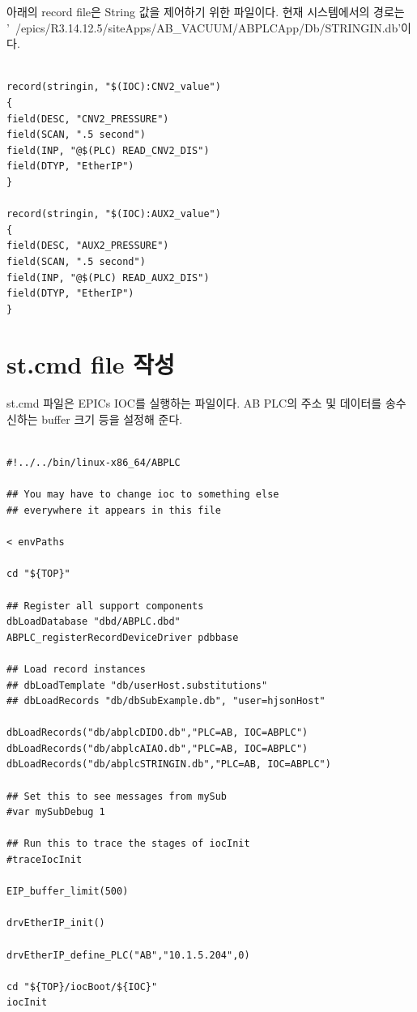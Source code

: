\documentclass[11pt
  , a4paper
  , article
  , oneside
]{memoir}
\begin{document}
아래의 record file은 String 값을 제어하기 위한 파일이다. 현재 시스템에서의 경로는 '~/epics/R3.14.12.5/siteApps/AB\_VACUUM/ABPLCApp/Db/STRINGIN.db'이다.\\
		
\begin{lstlisting}[style=termstyle]

record(stringin, "$(IOC):CNV2_value")
{
field(DESC, "CNV2_PRESSURE")
field(SCAN, ".5 second")
field(INP, "@$(PLC) READ_CNV2_DIS")
field(DTYP, "EtherIP")
}

record(stringin, "$(IOC):AUX2_value")
{
field(DESC, "AUX2_PRESSURE")
field(SCAN, ".5 second")
field(INP, "@$(PLC) READ_AUX2_DIS")
field(DTYP, "EtherIP")
}

\end{lstlisting}

\section{st.cmd file 작성}

st.cmd 파일은 EPICs IOC를 실행하는 파일이다. AB PLC의 주소 및 데이터를 송수신하는 buffer 크기 등을 설정해 준다.\\

\begin{lstlisting}[style=termstyle]

#!../../bin/linux-x86_64/ABPLC

## You may have to change ioc to something else
## everywhere it appears in this file

< envPaths

cd "${TOP}"

## Register all support components
dbLoadDatabase "dbd/ABPLC.dbd"
ABPLC_registerRecordDeviceDriver pdbbase

## Load record instances
## dbLoadTemplate "db/userHost.substitutions"
## dbLoadRecords "db/dbSubExample.db", "user=hjsonHost"

dbLoadRecords("db/abplcDIDO.db","PLC=AB, IOC=ABPLC")
dbLoadRecords("db/abplcAIAO.db","PLC=AB, IOC=ABPLC")
dbLoadRecords("db/abplcSTRINGIN.db","PLC=AB, IOC=ABPLC")

## Set this to see messages from mySub
#var mySubDebug 1

## Run this to trace the stages of iocInit
#traceIocInit

EIP_buffer_limit(500)

drvEtherIP_init()

drvEtherIP_define_PLC("AB","10.1.5.204",0)

cd "${TOP}/iocBoot/${IOC}"
iocInit


\end{lstlisting}
\end{document}
